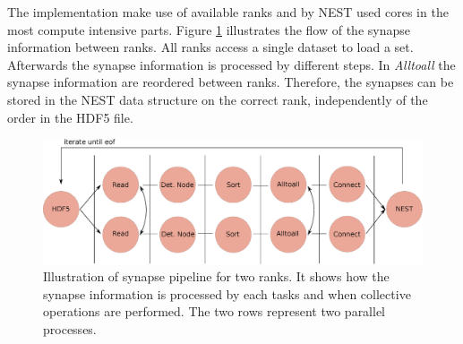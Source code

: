 The implementation make use of available ranks and by NEST used cores in the most compute intensive parts.
Figure \ref{fig:ConnectInsideIteration} illustrates the flow of the synapse information between ranks. 
All ranks access a single dataset to load a set. Afterwards the synapse information is processed by different steps.
In \emph{Alltoall} the synapse information are reordered between ranks.
Therefore, the synapses can be stored in the NEST data structure on the correct rank,
independently of the order in the HDF5 file.
\begin{figure}[ht!]
\centering
\includegraphics[scale=0.4]{pictures/Connect_inside_iteration.eps}
\caption[Illustration of synapse pipeline for two ranks]{Illustration of synapse pipeline for two ranks. It shows how the synapse information is processed by each tasks and when collective operations are performed.
The two rows represent two parallel processes.}
\label{fig:ConnectInsideIteration}
\end{figure}
\newpage
